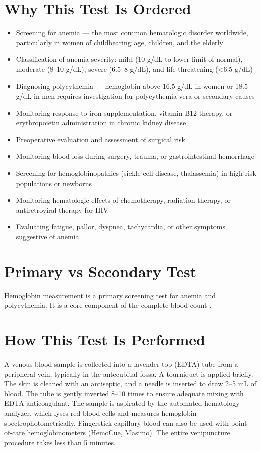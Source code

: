 \section*{Why This Test Is Ordered}
\begin{itemize}
  \item Screening for anemia --- the most common hematologic disorder worldwide, particularly in women of childbearing age, children, and the elderly
  \item Classification of anemia severity: mild (10 g/dL to lower limit of normal), moderate (8--10 g/dL), severe (6.5--8 g/dL), and life-threatening (<6.5 g/dL)
  \item Diagnosing polycythemia --- hemoglobin above 16.5 g/dL in women or 18.5 g/dL in men requires investigation for polycythemia vera or secondary causes
  \item Monitoring response to iron supplementation, vitamin B12 therapy, or erythropoietin administration in chronic kidney disease
  \item Preoperative evaluation and assessment of surgical risk
  \item Monitoring blood loss during surgery, trauma, or gastrointestinal hemorrhage
  \item Screening for hemoglobinopathies (sickle cell disease, thalassemia) in high-risk populations or newborns
  \item Monitoring hematologic effects of chemotherapy, radiation therapy, or antiretroviral therapy for HIV
  \item Evaluating fatigue, pallor, dyspnea, tachycardia, or other symptoms suggestive of anemia
\end{itemize}

\section*{Primary vs Secondary Test}
Hemoglobin measurement is a primary screening test for anemia and polycythemia. It is a core component of the complete blood count \cite{tierney2023current}.

\section*{How This Test Is Performed}
A venous blood sample is collected into a lavender-top (EDTA) tube from a peripheral vein, typically in the antecubital fossa. A tourniquet is applied briefly. The skin is cleaned with an antiseptic, and a needle is inserted to draw 2--5 mL of blood. The tube is gently inverted 8--10 times to ensure adequate mixing with EDTA anticoagulant. The sample is aspirated by the automated hematology analyzer, which lyses red blood cells and measures hemoglobin spectrophotometrically. Fingerstick capillary blood can also be used with point-of-care hemoglobinometers (HemoCue, Masimo). The entire venipuncture procedure takes less than 5 minutes.

